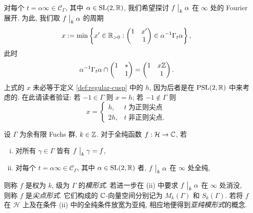 对每个 $t = \alpha\infty \in \mathcal{C}_\Gamma$, 其中 $\alpha \in \operatorname{SL}(2,\mathbb{R})$, 我们希望探讨 $f \;\big|_{k} \; \alpha$ 在 $\infty$ 处的 Fourier 展开. 为此, 我们取 $f \;\big|_{k} \; \alpha$ 的周期
\[ x := \min\left\{ x' \in \mathbb{R}_{>0} : \begin{pmatrix} 1 & x' \\  & 1 \end{pmatrix} \in \alpha^{-1}\Gamma_t \alpha \right\}, \]
此时
\[ \alpha^{-1} \Gamma_t \alpha \cap \begin{pmatrix} 1 & * \\  & 1 \end{pmatrix} = \begin{pmatrix} 1 & x\mathbb{Z} \\  & 1 \end{pmatrix}. \]
上式的 $x$ 未必等于定义 \ref{def:regular-cusp} 中的 $h$, 因为后者是在 $\operatorname{PSL}(2,\mathbb{R})$ 中来考虑的. 在此请读者验证: 若 $-1 \in \Gamma$ 则 $x=h$; 若 $-1 \notin \Gamma$ 则
\begin{equation}\label{eqn:x-vs-h}
	x = \begin{cases}
		h, & t \;\text{为正则尖点} \\
		2h, & t \;\text{非正则尖点}.
\end{cases}\end{equation}

\begin{definition}\label{def:modular-form-gen}
	   
	设 $\Gamma$ 为余有限 Fuchs 群, $k \in \mathbb{Z}$. 对于全纯函数 $f: \mathcal{H} \to \mathbb{C}$, 若
	\begin{enumerate}[(i)]
		\item 对所有 $\gamma \in \Gamma$ 皆有 $f \;\big|_{k} \; \gamma = f$,
		\item 对每个 $t = \alpha\infty \in \mathcal{C}_\Gamma$, 其中 $\alpha \in \operatorname{SL}(2,\mathbb{R})$ 者, $f\;\big|_{k} \;\alpha$ 在 $\infty$ 处全纯,
	\end{enumerate}
	则称 $f$ 是权为 $k$, 级为 $\Gamma$ 的\emph{模形式}. 若进一步在 (ii) 中要求 $f \;\big|_{k} \; \alpha$ 在 $\infty$ 处消没, 则称 $f$ 是\emph{尖点形式}. 它们构成的 $\mathbb{C}$-向量空间分别记为 $M_k(\Gamma)$ 和 $S_k(\Gamma)$. 若将 $f$ 在 $\mathcal{H}$ 上及在条件 (ii) 中的全纯条件放宽为亚纯, 相应地便得到\emph{亚纯模形式}的概念.
\end{definition}

